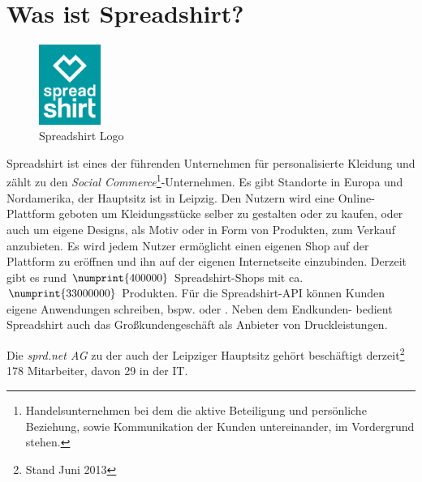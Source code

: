 \section{Was ist Spreadshirt?}

\begin{figure}[!htb]
	\centering
		\includegraphics[width=2cm]{resources/sprd_logo_cmyk}
	\caption{Spreadshirt Logo}
	\label{fig:spreadshirtLogo}
\end{figure}

Spreadshirt ist eines der führenden Unternehmen für personalisierte Kleidung und zählt zu den \emph{Social Commerce}\footnote{Handelsunternehmen bei dem die aktive Beteiligung und persönliche Beziehung, sowie Kommunikation der Kunden untereinander, im Vordergrund stehen.}-Unternehmen. Es gibt Standorte in Europa und Nordamerika, der Hauptsitz ist in Leipzig. 
Den Nutzern wird eine Online-Plattform geboten um Kleidungsstücke selber zu gestalten oder zu kaufen, oder auch um eigene Designs, als Motiv oder in Form von Produkten, zum Verkauf anzubieten. 
Es wird jedem Nutzer ermöglicht einen eigenen Shop auf der Plattform zu eröffnen und ihn auf der eigenen Internetseite einzubinden. Derzeit gibt es rund $\numprint{400000}$ Spreadshirt-Shops mit ca. $\numprint{33000000}$ Produkten.
Für die Spreadshirt-API können Kunden eigene Anwendungen schreiben, bspw.  oder .
Neben dem Endkunden- bedient Spreadshirt auch das Großkundengeschäft als Anbieter von Druckleistungen.

Die \emph{sprd.net AG} zu der auch der Leipziger Hauptsitz gehört beschäftigt derzeit\footnote{Stand Juni 2013} 178 Mitarbeiter, davon 29 in der IT.